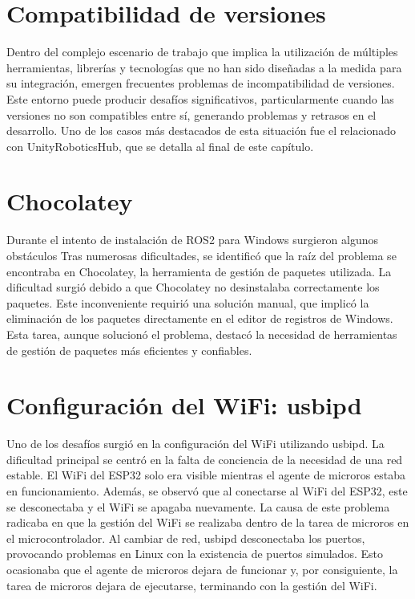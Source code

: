 \section{Compatibilidad de versiones}
Dentro del complejo escenario de trabajo que implica la utilización de múltiples herramientas, librerías y tecnologías que no han sido diseñadas a la medida para su integración, emergen frecuentes problemas de incompatibilidad de versiones. Este entorno puede producir desafíos significativos, particularmente cuando las versiones no son compatibles entre sí, generando problemas y retrasos en el desarrollo. Uno de los casos más destacados de esta situación fue el relacionado con UnityRoboticsHub, que se detalla al final de este cap\'itulo.

\section{Chocolatey}
Durante el intento de instalaci\'on de ROS2 para Windows surgieron algunos obstáculos Tras numerosas dificultades, se identificó que la raíz del problema se encontraba en Chocolatey, la herramienta de gestión de paquetes utilizada. La dificultad surgió debido a que Chocolatey no desinstalaba correctamente los paquetes. Este inconveniente requirió una solución manual, que implicó la eliminación de los paquetes directamente en el editor de registros de Windows. Esta tarea, aunque solucionó el problema, destacó la necesidad de herramientas de gestión de paquetes más eficientes y confiables.

\section{Configuración del WiFi: usbipd}
Uno de los desafíos surgió en la configuración del WiFi utilizando usbipd. La dificultad principal se centró en la falta de conciencia de la necesidad de una red estable. El WiFi del ESP32 solo era visible mientras el agente de microros estaba en funcionamiento. Además, se observó que al conectarse al WiFi del ESP32, este se desconectaba y el WiFi se apagaba nuevamente. La causa de este problema radicaba en que la gestión del WiFi se realizaba dentro de la tarea de microros en el microcontrolador. Al cambiar de red, usbipd desconectaba los puertos, provocando problemas en Linux con la existencia de puertos simulados. Esto ocasionaba que el agente de microros dejara de funcionar y, por consiguiente, la tarea de microros dejara de ejecutarse, terminando con la gestión del WiFi.



